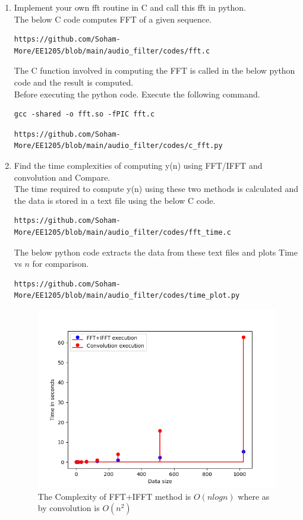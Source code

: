 \documentclass[journal,12pt,twocolumn]{IEEEtran}
\theoremstyle{remark}
\begin{document}
\begin{enumerate}[label=\thesection.\arabic*]
\item Implement your own fft routine in C and call this fft in python.\\

\solution The below C code computes FFT of a given sequence.
\begin{lstlisting}
https://github.com/Soham-More/EE1205/blob/main/audio_filter/codes/fft.c
\end{lstlisting}
The C function involved in computing the FFT is called in the below python code and the result is computed.\\

Before executing the  python code. Execute the following command.
\begin{lstlisting}
gcc -shared -o fft.so -fPIC fft.c
\end{lstlisting}

\begin{lstlisting}
https://github.com/Soham-More/EE1205/blob/main/audio_filter/codes/c_fft.py
\end{lstlisting}


\item Find the time complexities of computing y(n)
using FFT/IFFT and convolution and Compare.\\
\solution  The time required to compute y(n) using these two methods is calculated and the data is stored in a text file using the below C code.

\begin{lstlisting}
https://github.com/Soham-More/EE1205/blob/main/audio_filter/codes/fft_time.c
\end{lstlisting}
The below python code extracts the data from these text files and plots Time vs $n$ for comparison.
\begin{lstlisting}
https://github.com/Soham-More/EE1205/blob/main/audio_filter/codes/time_plot.py
\end{lstlisting}
\begin{figure}[h!]
\centering
\includegraphics[width=1\columnwidth]{figs/execplot.png}
\caption{The Complexity of FFT+IFFT method is $ O(nlogn)$ where as by convolution is $O(n^2)$}
\label{fig:time_complexity}
\end{figure}



\end{enumerate}
\end{document}
